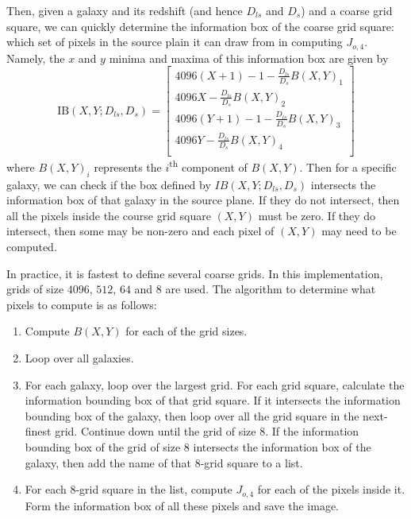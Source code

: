 \documentclass[10pt,twoside]{article}
\theoremstyle{definition}
\theoremstyle{exercise}
\begin{document}
Then, given a galaxy and its redshift (and hence $D_{ls}$ and $D_s$) and a coarse grid square, we can quickly determine the information box of the coarse grid square: which set of pixels in the source plain it can draw from in computing $J_{o,4}$. Namely, the $x$ and $y$ minima and maxima of this information box are given by
\begin{equation}
  \text{IB}(X,Y;D_{ls},D_s) = \begin{bmatrix}
    4096(X+1)-1-\frac{D_{ls}}{D_s}B(X,Y)_1\\
    4096X-\frac{D_{ls}}{D_s}B(X,Y)_2\\
    4096(Y+1)-1-\frac{D_{ls}}{D_s}B(X,Y)_3\\
    4096Y-\frac{D_{ls}}{D_s}B(X,Y)_4\\
  \end{bmatrix}
  \label{eq:grid_info_box}
\end{equation}
where $B(X,Y)_i$ represents the $i$\textsuperscript{th} component of $B(X,Y)$. Then for a specific galaxy, we can check if the box defined by $IB(X,Y; D_{ls}, D_s)$ intersects the information box of that galaxy in the source plane. If they do not intersect, then all the pixels inside the course grid square $(X,Y)$ must be zero. If they do intersect, then some may be non-zero and each pixel of $(X,Y)$ may need to be computed.

In practice, it is fastest to define several coarse grids. In this implementation, grids of size $4096$, $512$, $64$ and $8$ are used. The algorithm to determine what pixels to compute is as follows:
\begin{enumerate}
  \item Compute $B(X,Y)$ for each of the grid sizes.
  \item Loop over all galaxies.
  \item For each galaxy, loop over the largest grid. For each grid square, calculate the information bounding box of that grid square. If it intersects the information bounding box of the galaxy, then loop over all the grid square in the next-finest grid. Continue down until the grid of size $8$. If the information bounding box of the grid of size $8$ intersects the information box of the galaxy, then add the name of that $8$-grid square to a list.
  \item For each $8$-grid square in the list, compute $J_{o,4}$ for each of the pixels inside it. Form the information box of all these pixels and save the image.
\end{enumerate}
\end{document}
